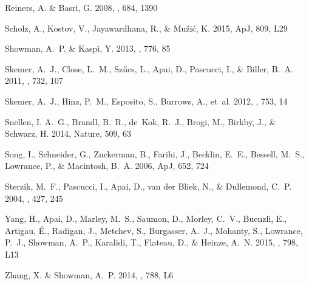 \documentclass[apj]{emulateapj}
\begin{document}
\begin{thebibliography}{52}
{Reiners}, A. \& {Basri}, G. 2008, \apj, 684, 1390

Scholz, A., Kostov, V., Jayawardhana, R., \& Mu{\v{z}}i{\'{c}}, K. 2015, ApJ,
  809, L29

{Showman}, A.~P. \& {Kaspi}, Y. 2013, \apj, 776, 85

{Skemer}, A.~J., {Close}, L.~M., {Sz{\H u}cs}, L., {Apai}, D., {Pascucci}, I.,
  \& {Biller}, B.~A. 2011, \apj, 732, 107

{Skemer}, A.~J., {Hinz}, P.~M., {Esposito}, S., {Burrows}, A., {et~al.} 2012,
  \apj, 753, 14

Snellen, I. A.~G., Brandl, B.~R., de~Kok, R.~J., Brogi, M., Birkby, J., \&
  Schwarz, H. 2014, Nature, 509, 63

Song, I., Schneider, G., Zuckerman, B., Farihi, J., Becklin, E.~E., Bessell,
  M.~S., Lowrance, P., \& Macintosh, B.~A. 2006, ApJ, 652, 724

{Sterzik}, M.~F., {Pascucci}, I., {Apai}, D., {van der Bliek}, N., \&
  {Dullemond}, C.~P. 2004, \aap, 427, 245

{Yang}, H., {Apai}, D., {Marley}, M.~S., {Saumon}, D., {Morley}, C.~V.,
  {Buenzli}, E., {Artigau}, {\'E}., {Radigan}, J., {Metchev}, S., {Burgasser},
  A.~J., {Mohanty}, S., {Lowrance}, P.~J., {Showman}, A.~P., {Karalidi}, T.,
  {Flateau}, D., \& {Heinze}, A.~N. 2015, \apjl, 798, L13

{Zhang}, X. \& {Showman}, A.~P. 2014, \apjl, 788, L6

\end{thebibliography}

\clearpage
\appendix
\LongTables


\end{document}
